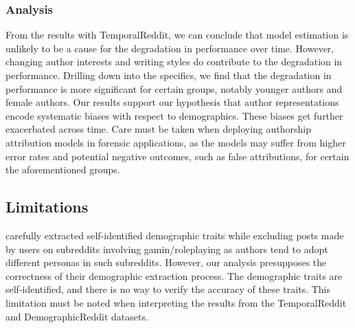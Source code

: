\subsubsection{Analysis}
From the results with TemporalReddit, we can conclude that model estimation is unlikely to be a cause for the degradation in performance over time.
However, changing author interests and writing styles do contribute to the degradation in performance.
Drilling down into the specifics, we find that the degradation in performance is more significant for certain groups, notably younger authors and female authors.
Our results support our hypothesis that author representations encode systematic biases with respect to demographics. 
These biases get further exacerbated across time.
Care must be taken when deploying authorship attribution models in forensic applications, as the models may suffer from higher error rates and potential negative outcomes, such as false attributions, for certain the aforementioned groups.


\subsection{Limitations}
\citet{tigunova2020reddust} carefully extracted self-identified demographic traits while excluding posts made by users on subreddits involving gamin/roleplaying as authors tend to adopt different personas in such subreddits.
However, our analysis presupposes the correctness of their demographic extraction process.
The demographic traits are self-identified, and there is no way to verify the accuracy of these traits.
This limitation must be noted when interpreting the results from the TemporalReddit and DemographicReddit datasets.




